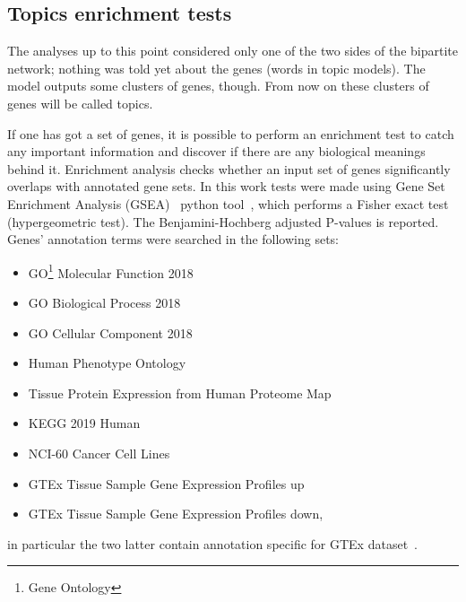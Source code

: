 \FloatBarrier
\subsection{Topics enrichment tests}
The analyses up to this point considered only one of the two sides of the bipartite network; nothing was told yet about the genes (words in topic models).
The model outputs some clusters of genes, though.  From now on these clusters of genes will be called topics.

If one has got a set of genes, it is possible to perform an enrichment test to catch any important information and discover if there are any biological meanings behind it. Enrichment analysis checks whether an input set of genes significantly overlaps with annotated gene sets.
In this work tests were made using Gene Set Enrichment Analysis (GSEA)~\cite{subramanian2005gene} python tool~\cite{Kuleshov2016}, which performs a Fisher exact test (hypergeometric test). The Benjamini-Hochberg adjusted P-values is reported. Genes' annotation terms were searched in the following sets: 
\begin{itemize}
		\item GO\footnote{Gene Ontology} Molecular Function 2018
		\item GO Biological Process 2018
		\item GO Cellular Component 2018
		\item Human Phenotype Ontology
		\item Tissue Protein Expression from Human Proteome Map
		\item KEGG 2019 Human
		\item NCI-60 Cancer Cell Lines
		\item GTEx Tissue Sample Gene Expression Profiles up
		\item GTEx Tissue Sample Gene Expression Profiles down,
\end{itemize}
in particular the two latter contain annotation specific for GTEx dataset~\cite{Ardlie2015}.

